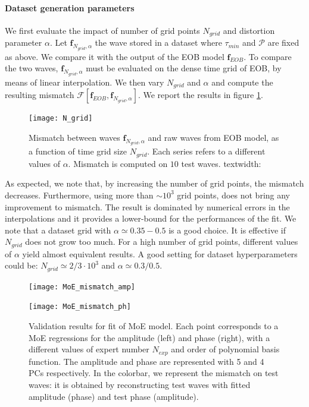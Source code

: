 \paragraph{Dataset generation parameters}
We first evaluate the impact of number of grid points $N_{grid}$ and distortion parameter $\alpha$.
Let $\mathbf{f}_{N_{grid}, \alpha}$ the wave stored in a dataset where $\tau_{min}$ and $\mathcal{P}$ are fixed as above. We compare it with the output of the EOB model $\mathbf{f}_{EOB}$.
To compare the two waves, $\mathbf{f}_{N_{grid}, \alpha}$ must be evaluated on the dense time grid of EOB, by means of linear interpolation.
We then vary $N_{grid}$ and $\alpha$ and compute the resulting mismatch $\mathcal{F}[\mathbf{f}_{EOB}, \mathbf{f}_{N_{grid}, \alpha}]$.
We report the results in figure \ref{fig:N_grid}.
\begin{figure}[!t]
	\centering
	\texttt{[image: N\_grid]}
	\caption{Mismatch between waves $\mathbf{f}_{N_{grid}, \alpha}$ and raw waves from EOB model, as a function of time grid size $N_{grid}$. Each series refers to a different values of $\alpha$.
Mismatch is computed on $10$ test waves.  textwidth: \prntlen{\linewidth}
}
	\label{fig:N_grid}
\end{figure}
\par
As expected, we note that, by increasing the number of grid points, the mismatch decreases. Furthermore, using more than $\sim 10^3$ grid points, does not bring any improvement to mismatch. The result is dominated by numerical errors in the interpolations and it provides a lower-bound for the performances of the fit.
We note that a dataset grid with $\alpha\simeq 	0.35-0.5$ is a good choice.
It is effective if $N_{grid}$ does not grow too much. For a high number of grid points, different values of $\alpha$ yield almost equivalent results.
A good setting for dataset hyperparameters could be: $N_{grid} \simeq 2/3 \cdot 10^{3}$ and $\alpha \simeq 0.3/0.5$.
\begin{figure}[!t]
	\centering
    \begin{minipage}{.5\linewidth}
        \centering
        \texttt{[image: MoE\_mismatch\_amp]}
    \end{minipage}\hfill
    \begin{minipage}{.5\linewidth}
        \centering
        \texttt{[image: MoE\_mismatch\_ph]}
    \end{minipage}
	\caption{Validation results for fit of MoE model. Each point corresponds to a MoE regressions for the amplitude (left) and phase (right), with a different values of expert number $N_{exp}$ and order of polynomial basis function.
The amplitude and phase are represented with 5 and 4 PCs respectively.
In the colorbar, we represent the mismatch on test waves: it is obtained by reconstructing test waves with fitted amplitude (phase) and test phase (amplitude).
}
	\label{fig:MoE_test}
\end{figure}


